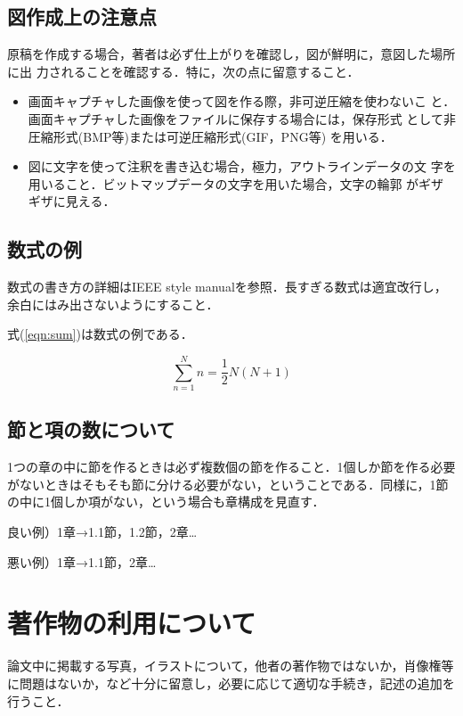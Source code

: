 \documentclass[twoside]{wiss}
\begin{document}
\subsection{図作成上の注意点}
原稿を作成する場合，著者は必ず仕上がりを確認し，図が鮮明に，意図した場所に出
力されることを確認する．特に，次の点に留意すること．
\begin{itemize}

 \item 画面キャプチャした画像を使って図を作る際，非可逆圧縮を使わないこ
       と．画面キャプチャした画像をファイルに保存する場合には，保存形式
       として非圧縮形式(BMP等)または可逆圧縮形式(GIF，PNG等) を用いる．

 \item 図に文字を使って注釈を書き込む場合，極力，アウトラインデータの文
       字を用いること．ビットマップデータの文字を用いた場合，文字の輪郭
       がギザギザに見える．
\end{itemize}

\subsection{数式の例}
数式の書き方の詳細はIEEE style manual\cite{IEEE2014}を参照．長すぎる数式は適宜改行し，余白にはみ出さないようにすること．

式(\ref{eqn:sum})は数式の例である．

\begin{equation}
\sum^{N}_{n=1}n = \frac{1}{2}N(N+1)
\label{eqn:sum}
\end{equation}

\subsection{節と項の数について}
1つの章の中に節を作るときは必ず複数個の節を作ること．1個しか節を作る必要がないときはそもそも節に分ける必要がない，ということである．同様に，1節の中に1個しか項がない，という場合も章構成を見直す．

良い例）1章→1.1節，1.2節，2章…

悪い例）1章→1.1節，2章…

\section{著作物の利用について}
論文中に掲載する写真，イラストについて，他者の著作物ではないか，肖像権等に問題はないか，など十分に留意し，必要に応じて適切な手続き，記述の追加を行うこと．
\end{document}
